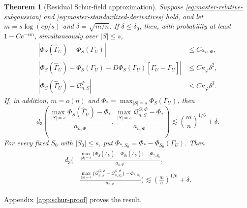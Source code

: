 \documentclass[a4paper,11pt,english]{article}
\newtheorem{theorem}{Theorem}[section]
\begin{document}
\begin{theorem}[Residual Schur-field approximation]
\label{thm:master-schur-field}
Suppose \eqref{eq:master-relative-subgaussian} and
\eqref{eq:master-standardized-derivatives} hold, and let
$m=s\log(ep/s)$ and $\delta=\sqrt{m/n}$.
If $\delta\le\delta_0$, then, with probability at least $1-Ce^{-cm}$,
simultaneously over $|S|\le s$,
\begin{align}
 |\Phi_S(\hat\Gamma_U)-\Phi_S(\Gamma_U)|
 &\le Ca_{n,\Phi},
 \label{eq:master-uniform-deviation}\\
 |\Phi_S(\hat\Gamma_U)-\Phi_S(\Gamma_U)
 -D\Phi_S(\Gamma_U)[\hat\Gamma_U-\Gamma_U]|
 &\le C\kappa_\varphi\delta^2,
 \label{eq:master-first-order}\\
 |\Phi_S(\hat\Gamma_U)-\mathcal Q_{n,S}^{\Phi}|
 &\le C\kappa_\varphi\delta^3.
 \label{eq:master-second-order}
\end{align}
If, in addition, $m=o(n)$ and
$\Phi_*=\max_{|S|=s}\Phi_S(\Gamma_U)$, then
\begin{equation}\label{eq:master-matched}
 d_3\left(
 \frac{\max_{|S|=s}\Phi_S(\hat\Gamma_U)-\Phi_*}{a_{n,\Phi}},
 \frac{\max_{|S|=s}\mathcal Q_{n,S}^{G,\Phi}-\Phi_*}{a_{n,\Phi}}
 \right)
 \lesssim\left(\frac mn\right)^{1/6}+\delta.
\end{equation}
For every fixed $S_0$ with $|S_0|\le s$, put
$\Phi_{*,S_0}=\Phi_*-\Phi_{S_0}(\Gamma_U)$.  Then
\begin{equation}\label{eq:master-anchored}
\begin{split}
 d_3\bigg(&
 \frac{\max_{|S|=s}
 \{\Phi_S(\hat\Gamma_U)-\Phi_{S_0}(\hat\Gamma_U)\}
 -\Phi_{*,S_0}}{a_{n,\Phi}},\\
 &\frac{\max_{|S|=s}
 \{\mathcal Q_{n,S}^{G,\Phi}-\mathcal Q_{n,S_0}^{G,\Phi}\}
 -\Phi_{*,S_0}}{a_{n,\Phi}}
 \bigg)
 \lesssim\left(\frac mn\right)^{1/6}+\delta.
\end{split}
\end{equation}
\end{theorem}

Appendix~\ref{app:schur-proof} proves the result.
\end{document}
